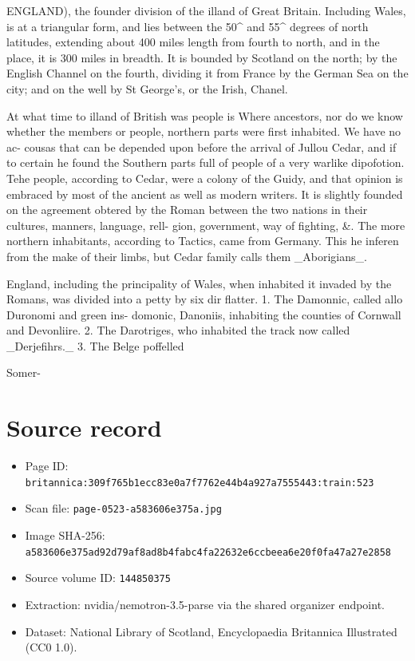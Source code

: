 \documentclass{article}
\begin{document}
ENGLAND), the founder division of the illand of Great Britain. Including Wales, is at a triangular form, and lies between the 50\textasciicircum{} and 55\textasciicircum{} degrees of north latitudes, extending about 400 miles length from fourth to north, and in the place, it is 300 miles in breadth. It is bounded by Scotland on the north; by the English Channel on the fourth, dividing it from France by the German Sea on the city; and on the well by St George's, or the Irish, Chanel.

At what time to illand of British was people is Where ancestors, nor do we know whether the members or people, northern parts were first inhabited. We have no ac- cousas that can be depended upon before the arrival of Jullou Cedar, and if to certain he found the Southern parts full of people of a very warlike dipofotion. Tehe people, according to Cedar, were a colony of the Guidy, and that opinion is embraced by most of the ancient as well as modern writers. It is slightly founded on the agreement obtered by the Roman between the two nations in their cultures, manners, language, rell- gion, government, way of fighting, \&. The more northern inhabitants, according to Tactics, came from Germany. This he inferen from the make of their limbs, but Cedar family calls them \_Aborigians\_.

England, including the principality of Wales, when inhabited it invaded by the Romans, was divided into a petty by six dir flatter. 1. The Damonnic, called allo Duronomi and green ins- domonic, Danoniis, inhabiting the counties of Cornwall and Devonliire. 2. The Darotriges, who inhabited the track now called \_Derjefihrs.\_ 3. The Belge poffelled

Somer-

\section*{Source record}
\begin{itemize}
\item Page ID: \texttt{britannica:309f765b1ecc83e0a7f7762e44b4a927a7555443:train:523}
\item Scan file: \texttt{page-0523-a583606e375a.jpg}
\item Image SHA-256: \texttt{a583606e375ad92d79af8ad8b4fabc4fa22632e6ccbeea6e20f0fa47a27e2858}
\item Source volume ID: \texttt{144850375}
\item Extraction: nvidia/nemotron-3.5-parse via the shared organizer endpoint.
\item Dataset: National Library of Scotland, Encyclopaedia Britannica Illustrated (CC0 1.0).
\end{itemize}
\end{document}
